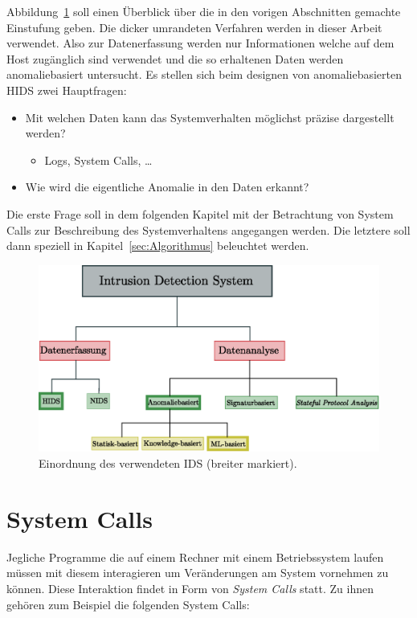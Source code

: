         Abbildung~\ref{fig:IDSOverview} soll einen Überblick über die in den vorigen Abschnitten gemachte Einstufung geben.
        Die dicker umrandeten Verfahren werden in dieser Arbeit verwendet.
        Also zur Datenerfassung werden nur Informationen welche auf dem Host zugänglich sind verwendet 
        und die so erhaltenen Daten werden anomaliebasiert untersucht.
        Es stellen sich beim designen von anomaliebasierten HIDS zwei Hauptfragen:
        \begin{itemize}
            \item Mit welchen Daten kann das Systemverhalten möglichst präzise dargestellt werden?
                \begin{itemize}
                    \item Logs, System Calls, \dots
                \end{itemize}
            \item Wie wird die eigentliche Anomalie in den Daten erkannt?
        \end{itemize}
        Die erste Frage soll in dem folgenden Kapitel mit der Betrachtung von System Calls zur Beschreibung des Systemverhaltens angegangen werden.
        Die letztere soll dann speziell in Kapitel~\ref{sec:Algorithmus} beleuchtet werden.

        \begin{figure}[ht]
            \centering
            \includegraphics[width=1\textwidth]{images/Illustrationen/IDS/IDSOverview}
            \caption{Einordnung des verwendeten IDS (breiter markiert).}
            \label{fig:IDSOverview}
        \end{figure}

    \section{System Calls}
    \label{sec:syscalls}
        Jegliche Programme die auf einem Rechner mit einem Betriebssystem laufen müssen mit diesem interagieren um Veränderungen am System vornehmen zu können.
        Diese Interaktion findet in Form von \textit{System Calls}  statt.
        Zu ihnen gehören zum Beispiel die folgenden System Calls:

